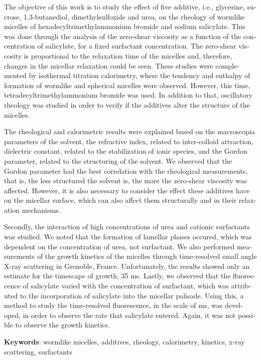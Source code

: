 \documentclass[
	12pt,				%
	openright,			%
	twoside,			%
	a4paper,			%
	english,			%
	brazil%
	]{abntex2}
\begin{document}
\begin{resumo}[Abstract]
 \begin{english}
   The objective of this work is to study the effect of five additive, i.e., glycerine, sucrose, 1,3-butanediol, dimethylsulfoxide and urea, on the rheology of wormlike micelles of hexadecyltrimethylammonium bromide and sodium salicylate. This was done through the analysis of the zero-shear viscosity as a function of the concentration of salicylate, for a fixed surfactant concentration. The zero-shear viscosity is proportional to the relaxation time of the micelles and, therefore, changes in the micellar relaxation could be seen. These studies were complemented by isothermal titration calorimetry, where the tendency and enthalpy of formation of wormlike and spherical micelles were observed. However, this time, tetradecyltrimethylammonium bromide was used. In addition to that, oscillatory rheology was studied in order to verify if the additives alter the structure of the micelles.
   
   The rheological and calorimetric results were explained based on the macroscopia parameters of the solvent, the refractive index, related to inter-colloid attraction, dielectric constant, related to the stabilization of ionic species, and the Gordon parameter, related to the structuring of the solvent. We observed that the Gordon parameter had the best correlation with the rheological measurements, that is, the less structured the solvent is, the more the zero-shear viscosity was affected. However, it is also necessary to consider the effect these additives have on the micellar surface, which can also affect them structurally and in their relaxation mechanisms.
   
   Secondly, the interaction of high concentrations of urea and cationic surfactants was studied. We noted that the formation of lamellar phases occured, which was dependent on the concentration of urea, not surfactant. We also performed measurements of the growth kinetics of the micelles through time-resolved small angle X-ray scattering in Grenoble, France. Unfortunately, the results showed only an estimate for the timescape of growth, 35 ms. Lastly, we observed that the fluorescence of salicylate varied with the concentration of surfactant, which was attributed to the incorporation of salicylate into the micellar palisade. Using this, a method to study the time-resolved fluorescence, in the scale of ms, was developed, in order to observe the rate that salicylate entered. Again, it was not possible to observe the growth kinetics.

   \vspace{\onelineskip}
 
   \noindent 
   \textbf{Keywords}: wormlike micelles, additives, rheology, calorimetry, kinetics, x-ray scattering, surfactants
 \end{english}
\end{resumo}
\end{document}
